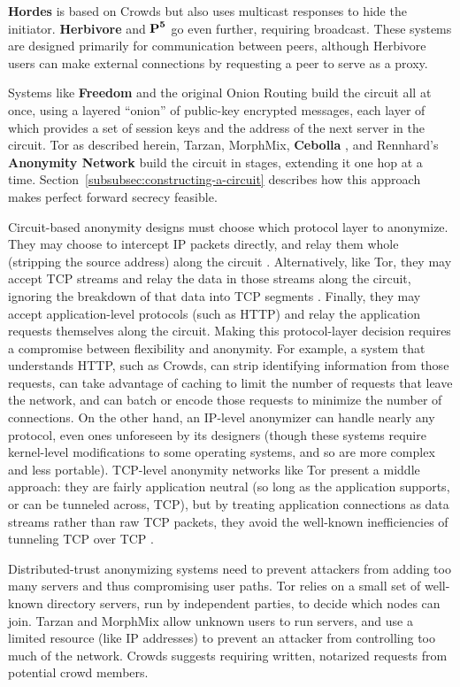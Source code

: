 \documentclass[times,10pt,twocolumn]{article}
\begin{document}
{\bf Hordes} \cite{hordes-jcs} is based on Crowds but also uses multicast
responses to hide the initiator. {\bf Herbivore} \cite{herbivore} and
$\mbox{\bf P}^{\mathbf 5}$ \cite{p5} go even further, requiring broadcast.
These systems are designed primarily for communication between peers,
although Herbivore users can make external connections by
requesting a peer to serve as a proxy.

Systems like {\bf Freedom} and the original Onion Routing build the circuit
all at once, using a layered ``onion'' of public-key encrypted messages,
each layer of which provides a set of session keys and the address of the
next server in the circuit. Tor as described herein, Tarzan, MorphMix,
{\bf Cebolla} \cite{cebolla}, and Rennhard's {\bf Anonymity Network} \cite{anonnet}
build the circuit
in stages, extending it one hop at a time.
Section~\ref{subsubsec:constructing-a-circuit} describes how this
approach makes perfect forward secrecy feasible.

Circuit-based anonymity designs must choose which protocol layer
to anonymize. They may choose to intercept IP packets directly, and
relay them whole (stripping the source address) along the circuit
\cite{freedom2-arch,tarzan:ccs02}.  Alternatively, like
Tor, they may accept TCP streams and relay the data in those streams
along the circuit, ignoring the breakdown of that data into TCP segments
\cite{morphmix:fc04,anonnet}. Finally, they may accept application-level
protocols (such as HTTP) and relay the application requests themselves
along the circuit.
Making this protocol-layer decision requires a compromise between flexibility
and anonymity.  For example, a system that understands HTTP, such as Crowds,
can strip
identifying information from those requests, can take advantage of caching
to limit the number of requests that leave the network, and can batch
or encode those requests to minimize the number of connections.
On the other hand, an IP-level anonymizer can handle nearly any protocol,
even ones unforeseen by its designers (though these systems require
kernel-level modifications to some operating systems, and so are more
complex and less portable). TCP-level anonymity networks like Tor present
a middle approach: they are fairly application neutral (so long as the
application supports, or can be tunneled across, TCP), but by treating
application connections as data streams rather than raw TCP packets,
they avoid the well-known inefficiencies of tunneling TCP over TCP
\cite{tcp-over-tcp-is-bad}.

Distributed-trust anonymizing systems need to prevent attackers from
adding too many servers and thus compromising user paths.
Tor relies on a small set of well-known directory servers, run by
independent parties, to decide which nodes can
join. Tarzan and MorphMix allow unknown users to run servers, and use
a limited resource (like IP addresses) to prevent an attacker from
controlling too much of the network.  Crowds suggests requiring
written, notarized requests from potential crowd members.
\end{document}
